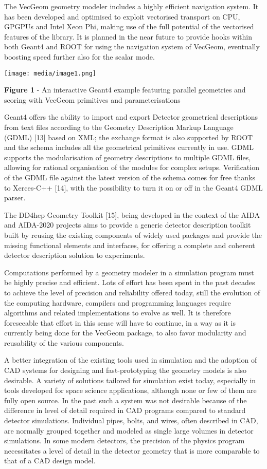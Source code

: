 \documentclass[12pt,a4paper]{article}
\begin{document}
The VecGeom geometry modeler includes a highly efficient navigation
system. It has been developed and optimised to exploit vectorised
transport on CPU, GPGPUs and Intel Xeon Phi, making use of the full
potential of the vectorised features of the library. It is planned in
the near future to provide hooks within both Geant4 and ROOT for using
the navigation system of VecGeom, eventually boosting speed further also
for the scalar mode.

\texttt{[image: media/image1.png]}

\textbf{Figure 1} - An interactive Geant4 example featuring parallel
geometries and scoring with VecGeom primitives and parameterisations

Geant4 offers the ability to import and export Detector geometrical
descriptions from text files according to the Geometry Description
Markup Language (GDML) {[}13{]} based on XML; the exchange format is
also supported by ROOT and the schema includes all the geometrical
primitives currently in use. GDML supports the modularisation of
geometry descriptions to multiple GDML files, allowing for rational
organisation of the modules for complex setups. Verification of the GDML
file against the latest version of the schema comes for free thanks to
Xerces-C++ {[}14{]}, with the possibility to turn it on or off in the
Geant4 GDML parser.

The DD4hep Geometry Toolkit {[}15{]}, being developed in the context of
the AIDA and AIDA-2020 projects aims to provide a generic detector
description toolkit built by reusing the existing components of widely
used packages and provide the missing functional elements and
interfaces, for offering a complete and coherent detector description
solution to experiments.

Computations performed by a geometry modeler in a simulation program
must be highly precise and efficient. Lots of effort has been spent in
the past decades to achieve the level of precision and reliability
offered today, still the evolution of the computing hardware, compilers
and programming languages require algorithms and related implementations
to evolve as well. It is therefore foreseeable that effort in this sense
will have to continue, in a way as it is currently being done for the
VecGeom package, to also favor modularity and reusability of the various
components.

A better integration of the existing tools used in simulation and the
adoption of CAD systems for designing and fast-prototyping the geometry
models is also desirable. A variety of solutions tailored for simulation
exist today, especially in tools developed for space science
applications, although none or few of them are fully open source. In the
past such a system was not desirable because of the difference in level
of detail required in CAD programs compared to standard detector
simulations. Individual pipes, bolts, and wires, often described in CAD,
are normally grouped together and modeled as single large volumes in
detector simulations. In some modern detectors, the precision of the
physics program necessitates a level of detail in the detector geometry
that is more comparable to that of a CAD design model.
\end{document}
